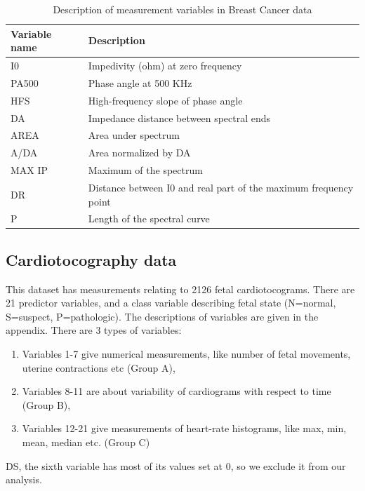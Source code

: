 \documentclass[11pt]{llncs}
\begin{document}
\begin{table}[h]\centering
    \begin{tabular}{l|l}
    \hline
    Variable name & Description          \\\hline
    I0       & Impedivity (ohm) at zero frequency                                \\
    PA500    & Phase angle at 500 KHz                                            \\
    HFS      & High-frequency slope of phase angle                               \\
    DA       & Impedance distance between spectral ends                          \\
    AREA     & Area under spectrum                                               \\
    A/DA     & Area normalized by DA                                             \\
    MAX IP   & Maximum of the spectrum                                           \\
    DR       & Distance between I0 and real part of the maximum frequency point  \\
    P        & Length of the spectral curve                                      \\\hline
    \end{tabular}
    \caption{Description of measurement variables in Breast Cancer data}
\end{table}

\subsection{Cardiotocography data}This dataset has measurements relating to 2126 fetal cardiotocograms. There are 21 predictor variables, and a class variable describing fetal state (N=normal, S=suspect, P=pathologic). The descriptions of variables are given in the appendix. There are 3 types of variables:
\begin{enumerate}
\item Variables 1-7 give numerical measurements, like number of fetal movements, uterine contractions etc (Group A),
\item Variables 8-11 are about variability of cardiograms with respect to time (Group B),
\item Variables 12-21 give measurements of heart-rate histograms, like max, min, mean, median etc. (Group C)
\end{enumerate}
DS, the sixth variable has most of its values set at 0, so we exclude it from our analysis.
\end{document}
